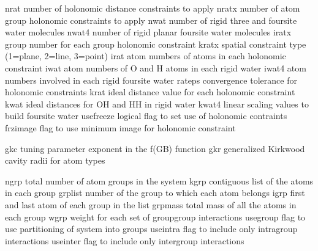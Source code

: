 \documentclass[letterpaper,11pt,english]{sphinxmanual}
\begin{document}
\begin{sphinxVerbatim}[commandchars=\\\{\}]
nrat            number of holonomic distance constraints to apply
nratx           number of atom group holonomic constraints to apply
nwat            number of rigid three\PYGZhy{} and four\PYGZhy{}site water molecules
nwat4           number of rigid planar four\PYGZhy{}site water molecules
iratx           group number for each group holonomic constraint
kratx           spatial constraint type (1=plane, 2=line, 3=point)
irat            atom numbers of atoms in each holonomic constraint
iwat            atom numbers of O and H atoms in each rigid water
iwat4           atom numbers involved in each rigid four\PYGZhy{}site water
rateps          convergence tolerance for holonomic constraints
krat            ideal distance value for each holonomic constraint
kwat            ideal distances for O\PYGZhy{}H and H\PYGZhy{}H in rigid water
kwat4           linear scaling values to build four\PYGZhy{}site water
use\PYGZus{}freeze      logical flag to set use of holonomic contraints
frzimage        flag to use minimum image for holonomic constraint
\end{sphinxVerbatim}

\sphinxAtStartPar
{}

\begin{sphinxVerbatim}[commandchars=\\\{\}]
gkc             tuning parameter exponent in the f(GB) function
gkr             generalized Kirkwood cavity radii for atom types
\end{sphinxVerbatim}

\sphinxAtStartPar
{}

\begin{sphinxVerbatim}[commandchars=\\\{\}]
ngrp            total number of atom groups in the system
kgrp            contiguous list of the atoms in each group
grplist         number of the group to which each atom belongs
igrp            first and last atom of each group in the list
grpmass         total mass of all the atoms in each group
wgrp            weight for each set of group\PYGZhy{}group interactions
use\PYGZus{}group       flag to use partitioning of system into groups
use\PYGZus{}intra       flag to include only intragroup interactions
use\PYGZus{}inter       flag to include only intergroup interactions
\end{sphinxVerbatim}
\end{document}
